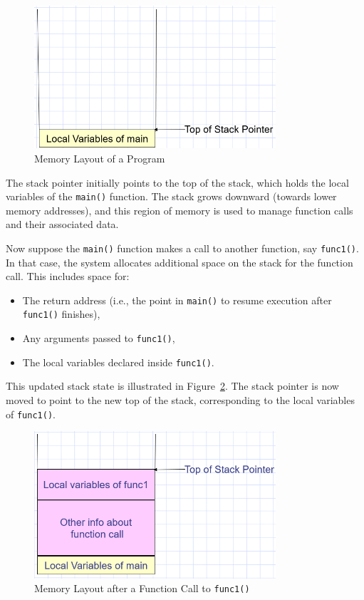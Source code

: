 \documentclass[12pt]{book}
\begin{document}
\begin{figure}[ht]
    \centering
    \includegraphics[width=0.8\textwidth]{images/memory_layout.png}
    \caption{Memory Layout of a Program}
    \label{fig:memory_layout}
\end{figure}

The stack pointer initially points to the top of the stack, which holds the local variables of the \texttt{main()} function. The stack grows downward (towards lower memory addresses), and this region of memory is used to manage function calls and their associated data.

Now suppose the \texttt{main()} function makes a call to another function, say \texttt{func1()}. In that case, the system allocates additional space on the stack for the function call. This includes space for:
\begin{itemize}
    \item The return address (i.e., the point in \texttt{main()} to resume execution after \texttt{func1()} finishes),
    \item Any arguments passed to \texttt{func1()},
    \item The local variables declared inside \texttt{func1()}.
\end{itemize}

This updated stack state is illustrated in Figure~\ref{fig:memory_layout_func1}. The stack pointer is now moved to point to the new top of the stack, corresponding to the local variables of \texttt{func1()}.

\begin{figure}[ht]
    \centering
    \includegraphics[width=0.8\textwidth]{images/memory_layout_func1.png}
    \caption{Memory Layout after a Function Call to \texttt{func1()}}
    \label{fig:memory_layout_func1}
\end{figure}
\end{document}
